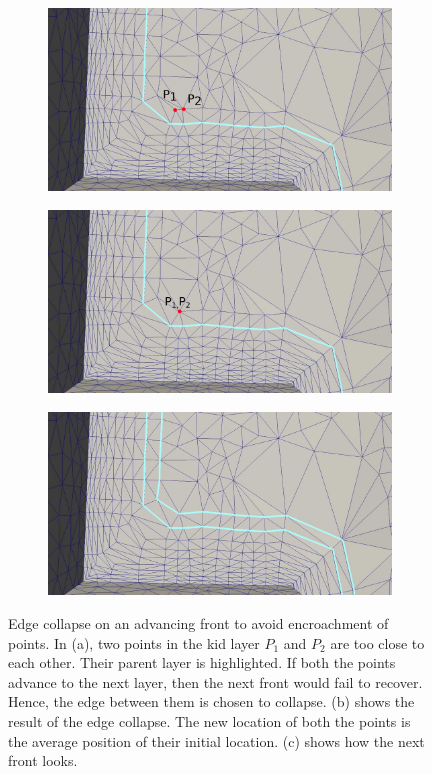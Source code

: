 \begin{figure}[hbt!]
\centering
\begin{subfigure}{.5\textwidth}
  \centering
  \includegraphics[width=.9\linewidth]{img/m2/edge-collapse/collapse1.eps}
  \caption{}
  \label{collapse1}
\end{subfigure}%
\begin{subfigure}{.5\textwidth}
  \centering
  \includegraphics[width=.9\linewidth]{img/m2/edge-collapse/collapse2.eps}
  \caption{}
  \label{collapse2}
\end{subfigure}
\begin{subfigure}{.5\textwidth}
  \centering
  \includegraphics[width=.9\linewidth]{img/m2/edge-collapse/collapse3.eps}
  \caption{}
  \label{collapse3}
\end{subfigure}
\caption[Vertex decimation on advancing front to maintain aspect ratio.]{Edge collapse on an advancing front to avoid encroachment of points. In (a), two points in the kid layer $P_1$ and $P_2$ are too close to each other. Their parent layer is highlighted. If both the points advance to the next layer, then the next front would fail to recover. Hence, the edge between them is chosen to collapse. (b) shows the result of the edge collapse. The new location of both the points is the average position of their initial location. (c) shows how the next front looks.}
\label{edge-collapse}
\end{figure}

